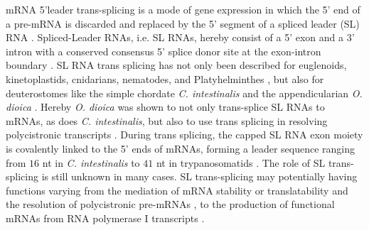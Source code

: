 \documentclass[graybox]{svmult}
\begin{document}
mRNA 5'leader trans-splicing is a mode of gene expression in which the 5' end 
of a pre-mRNA is discarded and replaced by the 5' segment of a spliced leader 
(SL) RNA \cite{Vandenberghe2001}. Spliced-Leader RNAs, i.e. SL RNAs, hereby 
consist of a 5' exon and a 3' intron with a conserved consensus 5' splice donor 
site at the exon-intron boundary \cite{Ganot2004}. SL RNA trans splicing has 
not only been described for euglenoids, kinetoplastids, cnidarians, nematodes, 
and Platyhelminthes \cite{Ganot2004}, but also for deuterostomes like the simple 
chordate \textit{C. intestinalis} \cite{Vandenberghe2001} and the 
appendicularian \textit{O. dioica} \cite{Ganot2004}. Hereby \textit{O. dioica} 
was shown to not only trans-splice SL RNAs to mRNAs, as does \textit{C. 
intestinalis}, but also to use trans splicing in resolving polycistronic 
transcripts \cite{Ganot2004}. During trans splicing, the capped SL RNA exon 
moiety is covalently linked to the 5' ends of mRNAs, forming a leader sequence 
ranging from $16$ nt in \textit{C. intestinalis} to $41$ nt in trypanosomatids 
\cite{Ganot2004}. The role of SL trans-splicing is still unknown in many cases. 
SL trans-splicing may potentially having functions varying from the mediation 
of mRNA stability or translatability \cite{Maroney1995} and the resolution 
of polycistronic pre-mRNAs \cite{Agabian1990, Blumenthal1995}, to the 
production of functional mRNAs from RNA polymerase I 
transcripts \cite{ShuLee1997}.




%
\end{document}
